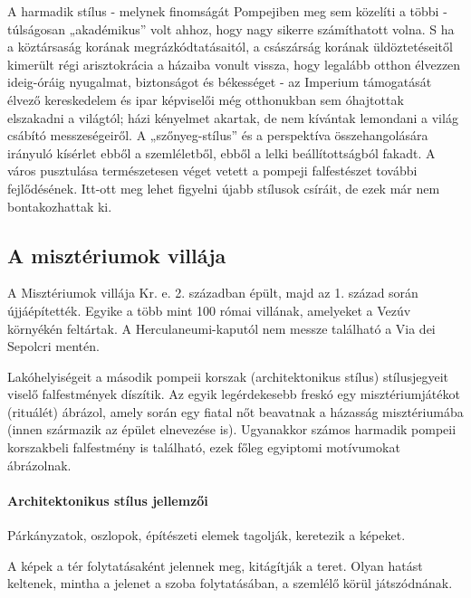A harmadik stílus - melynek finomságát Pompejiben meg sem közelíti a többi - túlságosan „akadémikus” volt ahhoz, hogy nagy sikerre számíthatott volna. S ha a
köztársaság korának megrázkódtatásaitól, a császárság korának üldöztetéseitől kimerült 
régi arisztokrácia a házaiba vonult vissza, hogy legalább otthon élvezzen ideig-óráig
nyugalmat, biztonságot és békességet - az Imperium támogatását élvező kereskedelem és
ipar képviselői még otthonukban sem óhajtottak elszakadni a világtól; házi kényelmet
akartak, de nem kívántak lemondani a világ csábító messzeségeiről.
A „szőnyeg-stílus” és a perspektíva összehangolására irányuló kísérlet ebből a
szemléletből, ebből a lelki beállítottságból fakadt. A város pusztulása természetesen véget
vetett a pompeji falfestészet további fejlődésének. Itt-ott meg lehet figyelni újabb stílusok
csíráit, de ezek már nem bontakozhattak ki.


\subsection*{A misztériumok villája}


A Misztériumok villája Kr. e. 2. században épült, majd az 1. század során újjáépítették. Egyike a több mint 100 római villának, amelyeket a Vezúv környékén feltártak. A Herculaneumi-kaputól nem messze található a Via dei Sepolcri mentén.

Lakóhelyiségeit a második pompeii korszak (architektonikus stílus) stílusjegyeit viselő falfestmények díszítik. Az egyik legérdekesebb freskó egy misztériumjátékot (rituálét) ábrázol, amely során egy fiatal nőt beavatnak a házasság misztériumába (innen származik az épület elnevezése is). Ugyanakkor számos harmadik pompeii korszakbeli falfestmény is található, ezek főleg egyiptomi motívumokat ábrázolnak.

\paragraph{Architektonikus stílus jellemzői}
\begin{compactitem}
	\item Párkányzatok, oszlopok, építészeti elemek tagolják, keretezik a képeket.
	
	\item A képek a tér folytatásaként jelennek meg, kitágítják a teret. Olyan hatást keltenek, mintha a jelenet a szoba folytatásában, a szemlélő körül játszódnának.
\end{compactitem}

